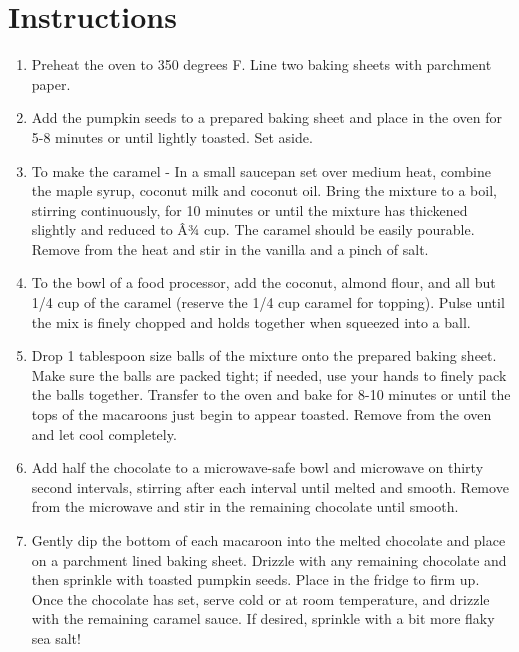 \documentclass[
  letterpaper,
  DIV=11,
  numbers=noendperiod,
  titlepage=false]{scrreprt}
\providecommand{\tightlist}{%
  \setlength{\itemsep}{0pt}\setlength{\parskip}{0pt}}\usepackage{longtable,booktabs,array}
\begin{document}
\section{Instructions}\label{instructions-166}

\begin{enumerate}
\def\labelenumi{\arabic{enumi}.}
\tightlist
\item
  Preheat the oven to 350 degrees F. Line two baking sheets with
  parchment paper.
\item
  Add the pumpkin seeds to a prepared baking sheet and place in the oven
  for 5-8 minutes or until lightly toasted. Set aside.
\item
  To make the caramel - In a small saucepan set over medium heat,
  combine the maple syrup, coconut milk and coconut oil. Bring the
  mixture to a boil, stirring continuously, for 10 minutes or until the
  mixture has thickened slightly and reduced to Â¾ cup. The caramel
  should be easily pourable. Remove from the heat and stir in the
  vanilla and a pinch of salt.
\item
  To the bowl of a food processor, add the coconut, almond flour, and
  all but 1/4 cup of the caramel (reserve the 1/4 cup caramel for
  topping). Pulse until the mix is finely chopped and holds together
  when squeezed into a ball.
\item
  Drop 1 tablespoon size balls of the mixture onto the prepared baking
  sheet. Make sure the balls are packed tight; if needed, use your hands
  to finely pack the balls together. Transfer to the oven and bake for
  8-10 minutes or until the tops of the macaroons just begin to appear
  toasted. Remove from the oven and let cool completely.
\item
  Add half the chocolate to a microwave-safe bowl and microwave on
  thirty second intervals, stirring after each interval until melted and
  smooth. Remove from the microwave and stir in the remaining chocolate
  until smooth.
\item
  Gently dip the bottom of each macaroon into the melted chocolate and
  place on a parchment lined baking sheet. Drizzle with any remaining
  chocolate and then sprinkle with toasted pumpkin seeds. Place in the
  fridge to firm up. Once the chocolate has set, serve cold or at room
  temperature, and drizzle with the remaining caramel sauce. If desired,
  sprinkle with a bit more flaky sea salt!
\end{enumerate}

\end{document}
